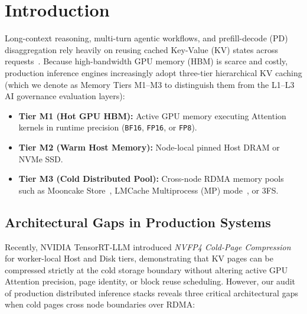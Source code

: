 \documentclass[10pt,twocolumn]{article}
\begin{document}
\section{Introduction}
Long-context reasoning, multi-turn agentic workflows, and prefill-decode (PD) disaggregation rely heavily on reusing cached Key-Value (KV) states across requests~\cite{kwon2023vllm,zheng2024sglang,qin2024mooncake}. Because high-bandwidth GPU memory (HBM) is scarce and costly, production inference engines increasingly adopt three-tier hierarchical KV caching (which we denote as Memory Tiers M1--M3 to distinguish them from the L1--L3 AI governance evaluation layers):
\begin{itemize}
    \item \textbf{Tier M1 (Hot GPU HBM):} Active GPU memory executing Attention kernels in runtime precision (\texttt{BF16}, \texttt{FP16}, or \texttt{FP8}).
    \item \textbf{Tier M2 (Warm Host Memory):} Node-local pinned Host DRAM or NVMe SSD.
    \item \textbf{Tier M3 (Cold Distributed Pool):} Cross-node RDMA memory pools such as Mooncake Store~\cite{qin2024mooncake}, LMCache Multiprocess (MP) mode~\cite{cheng2025lmcache,liu2024cachegen}, or 3FS.
\end{itemize}

\subsection{Architectural Gaps in Production Systems}
Recently, NVIDIA TensorRT-LLM introduced \textit{NVFP4 Cold-Page Compression}~\cite{nvidia2026trtllmcoldpage} for worker-local Host and Disk tiers, demonstrating that KV pages can be compressed strictly at the cold storage boundary without altering active GPU Attention precision, page identity, or block reuse scheduling. However, our audit of production distributed inference stacks reveals three critical architectural gaps when cold pages cross node boundaries over RDMA:
\end{document}
